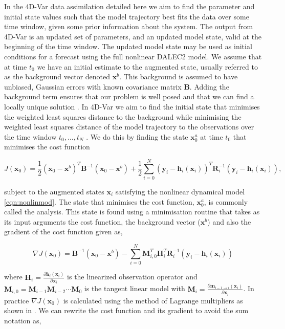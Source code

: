 \documentclass[review]{elsarticle}
\begin{document}
In the 4D-Var data assimilation detailed here we aim to find the parameter and initial state values such that the model trajectory best fits the data over some time window, given some prior information about the system. The output from 4D-Var is an updated set of parameters, and an updated model state, valid at the beginning of the time window. The updated model state may be used as initial conditions for a forecast using the full nonlinear DALEC2 model. We assume that at time $t_{0}$ we have an initial estimate to the augmented state, usually referred to as the background vector denoted $\textbf{x}^{b}$. This background is assumed to have unbiased, Gaussian errors with known covariance matrix $\textbf{B}$. Adding the background term ensures that our problem is well posed and that we can find a locally unique solution \citep{Tremolet2006}. In 4D-Var we aim to find the initial state that minimises the weighted least squares distance to the background while minimising the weighted least squares distance of the model trajectory to the observations over the time window $t_{0}, \dots, t_{N}$ \citep{lawless2013}. We do this by finding the state $\textbf{x}^{a}_{0}$ at time $t_{0}$ that minimises the cost function
\begin{linenomath}
\begin{equation}
J(\textbf{x}_0) = \frac{1}{2}(\textbf{x}_0-\textbf{x}^b)^{T}\textbf{B}^{-1}(\textbf{x}_0-\textbf{x}^b)+\frac{1}{2}\sum_{i=0}^{N}(\textbf{y}_i-\textbf{h}_i(\textbf{x}_i))^{T}\textbf{R}_{i}^{-1}(\textbf{y}_i-\textbf{h}_i(\textbf{x}_i)),
\end{equation}
\end{linenomath}
subject to the augmented states $\textbf{x}_{i}$ satisfying the nonlinear dynamical model \eqref{eqn:nonlinmod}. The state that minimises the cost function, $\textbf{x}^{a}_{0}$, is commonly called the analysis. This state is found using a minimisation routine that takes as its input arguments the cost function, the background vector ($\textbf{x}^{b}$) and also the gradient of the cost function given as,
\begin{linenomath}
\begin{equation}
\nabla J(\textbf{x}_0) = \textbf{B}^{-1}(\textbf{x}_0-\textbf{x}^{b})-\sum_{i=0}^{N}\textbf{M}_{i,0}^{T}\textbf{H}_i^{T}\textbf{R}_{i}^{-1}(\textbf{y}_i-\textbf{h}_i(\textbf{x}_i))
\end{equation}
\end{linenomath}
where $\textbf{H}_i = \frac{\partial \textbf{h}_i(\textbf{x}_i)}{\partial\textbf{x}_i}$ is the linearized observation operator and $\mathbf{M}_{i,0}=\mathbf{M}_{i-1}\mathbf{M}_{i-2}\cdots\mathbf{M}_0$ is the tangent linear model with $\mathbf{M}_i=\frac{\partial \textbf{m}_{i-1\rightarrow i}(\textbf{x}_{i})}{\partial \textbf{x}_{i}}$. In practice $\nabla J(\textbf{x}_0)$ is calculated using the method of Lagrange multipliers as shown in \citet{lawless2013}. We can rewrite the cost function and its gradient to avoid the sum notation as,
\end{document}
